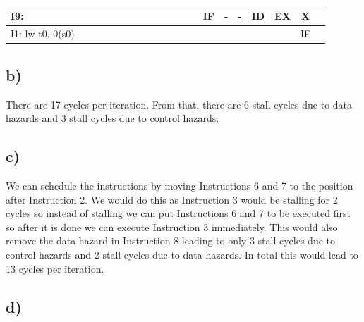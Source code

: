 \documentclass{article}
\begin{document}
\begin{table}[h]
{\begin{tabular}{|l|l|c|c|c|c|c|c|c|c|c|c|c|c|c|c|l|l|l|l|}
    I9:                                         &                         &                       &                       &                       &                       &                       &                       &                       & \multicolumn{1}{l|}{} & \multicolumn{1}{l|}{} & \multicolumn{1}{l|}{} & \multicolumn{1}{l|}{} & IF                    & -                     & -                     & \multicolumn{1}{c|}{ID} & \multicolumn{1}{c|}{EX}  & \multicolumn{1}{c|}{X}  & \multicolumn{1}{c|}{}   \\ \hline
    I1: lw    t0, 0(s0)                         &                         & \multicolumn{1}{l|}{} &                       &                       &                       &                       &                       &                       &                       & \multicolumn{1}{l|}{} &                       &                       &                       &                       &                       & \multicolumn{1}{c|}{}   & \multicolumn{1}{c|}{}    & \multicolumn{1}{c|}{IF} & \multicolumn{1}{c|}{}   \\ \hline
    \end{tabular}%
    }
\end{table}

\subsection*{b)}

There are 17 cycles per iteration. From that, there are 6 
stall cycles due to data hazards and 3 stall cycles due to control hazards.
\subsection*{c)}

We can schedule the instructions by moving Instructions 6 and 7 to the
position after Instruction 2. We would do this as Instruction 3 would be 
stalling for 2 cycles so instead of stalling we can put Instructions 6 and 7
to be executed first so after it is done we can execute Instruction 3 immediately.
This would also remove the data hazard in Instruction 8 leading to only 
3 stall cycles due to control hazards and 2 stall cycles due to data hazards.
In total this would lead to 13 cycles per iteration.

\subsection*{d)}
\end{document}
